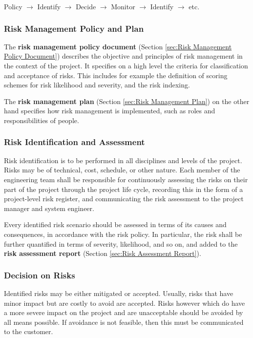 Policy
$\rightarrow$ Identify
$\rightarrow$ Decide
$\rightarrow$ Monitor
$\rightarrow$ Identify
$\rightarrow$ etc.

\subsubsection{Risk Management Policy and Plan}

The \textbf{risk management policy document} (Section \ref{sec:Risk Management Policy Document}) describes the objective and principles of risk management in the context of the project. It specifies on a high level the criteria for classification and acceptance of risks. This includes for example the definition of scoring schemes for risk likelihood and severity, and the risk indexing.

The \textbf{risk management plan} (Section \ref{sec:Risk Management Plan}) on the other hand specifies how risk management is implemented, such as roles and responsibilities of people.

\subsubsection{Risk Identification and Assessment}

Risk identification is to be performed in all disciplines and levels of the project. Risks may be of technical, cost, schedule, or other nature. Each member of the engineering team shall be responsible for continuously assessing the risks on their part of the project through the project life cycle, recording this in the form of a project-level risk register, and communicating the risk assessment to the project manager and system engineer.

Every identified risk scenario should be assessed in terms of its causes and consequences, in accordance with the risk policy. In particular, the risk shall be further quantified in terms of severity, likelihood, and so on, and added to the \textbf{risk assessment report} (Section \ref{sec:Risk Assessment Report}).

\subsubsection{Decision on Risks}
 
Identified risks may be either mitigated or accepted. Usually, risks that have minor impact but are costly to avoid are accepted. Risks however which do have a more severe impact on the project and are unacceptable should be avoided by all means possible. If avoidance is not feasible, then this must be communicated to the customer.

